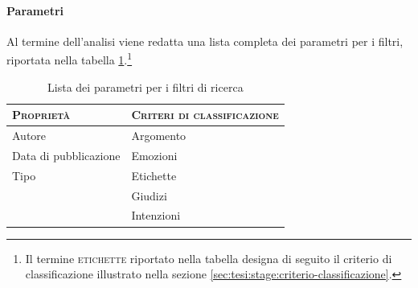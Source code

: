 \paragraph{Parametri}
Al termine dell'analisi viene redatta una lista completa dei parametri per i filtri, riportata nella tabella \ref{tab:tesi:stage:parametri-filtri}.\footnote{Il termine \textsc{etichette} riportato nella tabella designa di seguito il criterio di classificazione illustrato nella sezione \ref{sec:tesi:stage:criterio-classificazione}.}
\begin{table}[ht]
\centering
\begin{tabular}{|l|l|}
\hline
\textsc{Proprietà} & \textsc{Criteri di classificazione} \\ \hline
Autore & Argomento \\
Data di pubblicazione & Emozioni \\
Tipo & Etichette \\
& Giudizi \\
& Intenzioni \\ \hline
\end{tabular}
\caption{Lista dei parametri per i filtri di ricerca}
\label{tab:tesi:stage:parametri-filtri}
\end{table}

